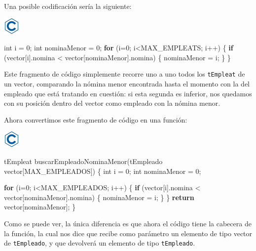 \documentclass[
]{book}
\newenvironment{Shaded}{\begin{snugshade}}{\end{snugshade}}
\newcommand{\ControlFlowTok}[1]{\textcolor[rgb]{0.13,0.29,0.53}{\textbf{#1}}}
\newcommand{\DataTypeTok}[1]{\textcolor[rgb]{0.13,0.29,0.53}{#1}}
\newcommand{\DecValTok}[1]{\textcolor[rgb]{0.00,0.00,0.81}{#1}}
\newcommand{\NormalTok}[1]{#1}
\begin{document}
Una posible codificación sería la siguiente:

\includegraphics{./img/c.png}

\begin{Shaded}
\begin{Highlighting}[]
\DataTypeTok{int}\NormalTok{ i = }\DecValTok{0}\NormalTok{; }
\DataTypeTok{int}\NormalTok{ nominaMenor = }\DecValTok{0}\NormalTok{;}
\ControlFlowTok{for}\NormalTok{ (i=}\DecValTok{0}\NormalTok{; i\textless{}MAX\_EMPLEATS; i++) \{}
    \ControlFlowTok{if}\NormalTok{ (vector[i].nomina \textless{} vector[nominaMenor].nomina) \{}
\NormalTok{        nominaMenor = i;}
\NormalTok{    \}}
\NormalTok{\}}
\end{Highlighting}
\end{Shaded}

Este fragmento de código simplemente recorre uno a uno todos los \texttt{tEmpleat} de un vector, comparando la nómina menor encontrada hasta el momento con la del empleado que está tratando en cuestión: si esta segunda es inferior, nos quedamos con su posición dentro del vector como empleado con la nómina menor.

Ahora convertimos este fragmento de código en una función:

\includegraphics{./img/c.png}

\begin{Shaded}
\begin{Highlighting}[]
\NormalTok{tEmpleat buscarEmpleadoNominaMenor(tEmpleado vector[MAX\_EMPLEADOS]) \{}
    \DataTypeTok{int}\NormalTok{ i = }\DecValTok{0}\NormalTok{; }
    \DataTypeTok{int}\NormalTok{ nominaMenor = }\DecValTok{0}\NormalTok{;}

    \ControlFlowTok{for}\NormalTok{ (i=}\DecValTok{0}\NormalTok{; i\textless{}MAX\_EMPLEADOS; i++) \{}
        \ControlFlowTok{if}\NormalTok{ (vector[i].nomina \textless{} vector[nominaMenor].nomina) \{}
\NormalTok{            nominaMenor = i;}
\NormalTok{        \}}
\NormalTok{    \}}
    \ControlFlowTok{return}\NormalTok{ vector[nominaMenor];}
\NormalTok{\}}
\end{Highlighting}
\end{Shaded}

Como se puede ver, la única diferencia es que ahora el código tiene la cabecera de la función, la cual nos dice que recibe como parámetro un elemento de tipo vector de \texttt{tEmpleado}, y que devolverá un elemento de tipo \texttt{tEmpleado}.
\end{document}
